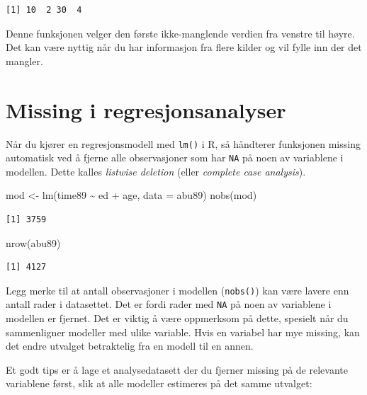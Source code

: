 \documentclass[
  norsk,
  letterpaper,
  DIV=11,
  numbers=noendperiod]{scrreprt}
\newenvironment{Shaded}{\begin{snugshade}}{\end{snugshade}}
\newcommand{\AttributeTok}[1]{\textcolor[rgb]{0.40,0.45,0.13}{#1}}
\newcommand{\FunctionTok}[1]{\textcolor[rgb]{0.28,0.35,0.67}{#1}}
\newcommand{\NormalTok}[1]{\textcolor[rgb]{0.00,0.23,0.31}{#1}}
\newcommand{\OtherTok}[1]{\textcolor[rgb]{0.00,0.23,0.31}{#1}}
\newcommand{\SpecialCharTok}[1]{\textcolor[rgb]{0.37,0.37,0.37}{#1}}
\theoremstyle{definition}
\theoremstyle{remark}
\begin{document}
\begin{verbatim}
[1] 10  2 30  4
\end{verbatim}

Denne funksjonen velger den første ikke-manglende verdien fra venstre
til høyre. Det kan være nyttig når du har informasjon fra flere kilder
og vil fylle inn der det mangler.

\section{Missing i
regresjonsanalyser}\label{missing-i-regresjonsanalyser}

Når du kjører en regresjonsmodell med \texttt{lm()} i R, så håndterer
funksjonen missing automatisk ved å fjerne alle observasjoner som har
\texttt{NA} på noen av variablene i modellen. Dette kalles
\emph{listwise deletion} (eller \emph{complete case analysis}).

\begin{Shaded}
\begin{Highlighting}[]
\NormalTok{mod }\OtherTok{\textless{}{-}} \FunctionTok{lm}\NormalTok{(time89 }\SpecialCharTok{\textasciitilde{}}\NormalTok{ ed }\SpecialCharTok{+}\NormalTok{ age, }\AttributeTok{data =}\NormalTok{ abu89)}
\FunctionTok{nobs}\NormalTok{(mod)}
\end{Highlighting}
\end{Shaded}

\begin{verbatim}
[1] 3759
\end{verbatim}

\begin{Shaded}
\begin{Highlighting}[]
\FunctionTok{nrow}\NormalTok{(abu89)}
\end{Highlighting}
\end{Shaded}

\begin{verbatim}
[1] 4127
\end{verbatim}

Legg merke til at antall observasjoner i modellen (\texttt{nobs()}) kan
være lavere enn antall rader i datasettet. Det er fordi rader med
\texttt{NA} på noen av variablene i modellen er fjernet. Det er viktig å
være oppmerksom på dette, spesielt når du sammenligner modeller med
ulike variable. Hvis en variabel har mye missing, kan det endre utvalget
betraktelig fra en modell til en annen.

Et godt tips er å lage et analysedatasett der du fjerner missing på de
relevante variablene først, slik at alle modeller estimeres på det samme
utvalget:
\end{document}
